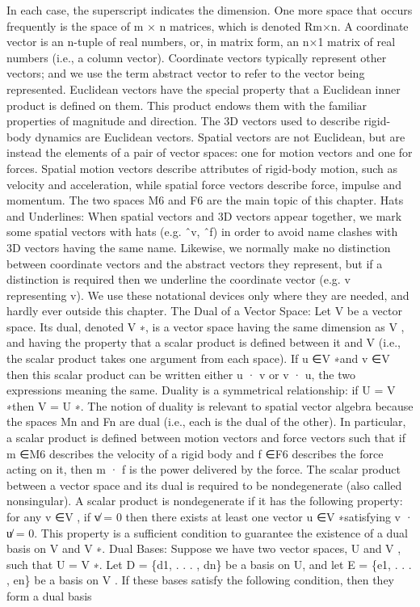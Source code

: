 In each case, the superscript indicates the dimension. One more space that occurs frequently is the space of m × n matrices, which is denoted Rm×n. A coordinate vector is an n-tuple of real numbers, or, in matrix form, an n×1 matrix of real numbers (i.e., a column vector). Coordinate vectors typically represent other vectors; and we use the term abstract vector to refer to the vector being represented. Euclidean vectors have the special property that a Euclidean inner product is defined on them. This product endows them with the familiar properties of magnitude and direction. The 3D vectors used to describe rigid-body dynamics are Euclidean vectors. Spatial vectors are not Euclidean, but are instead the elements of a pair of vector spaces: one for motion vectors and one for forces. Spatial motion vectors describe attributes of rigid-body motion, such as velocity and acceleration, while spatial force vectors describe force, impulse and momentum. The two spaces M6 and F6 are the main topic of this chapter. Hats and Underlines: When spatial vectors and 3D vectors appear together, we mark some spatial vectors with hats (e.g. ˆv, ˆf) in order to avoid name clashes with 3D vectors having the same name. Likewise, we normally make no distinction between coordinate vectors and the abstract vectors they represent, but if a distinction is required then we underline the coordinate vector (e.g. v representing v). We use these notational devices only where they are needed, and hardly ever outside this chapter. The Dual of a Vector Space: Let V be a vector space. Its dual, denoted V ∗, is a vector space having the same dimension as V , and having the property that a scalar product is defined between it and V (i.e., the scalar product takes one argument from each space). If u ∈V ∗and v ∈V then this scalar product can be written either u · v or v · u, the two expressions meaning the same. Duality is a symmetrical relationship: if U = V ∗then V = U ∗. The notion of duality is relevant to spatial vector algebra because the spaces Mn and Fn are dual (i.e., each is the dual of the other). In particular, a scalar product is defined between motion vectors and force vectors such that if m ∈M6 describes the velocity of a rigid body and f ∈F6 describes the force acting on it, then m · f is the power delivered by the force. The scalar product between a vector space and its dual is required to be nondegenerate (also called nonsingular). A scalar product is nondegenerate if it has the following property: for any v ∈V , if v̸ = 0 then there exists at least one vector u ∈V ∗satisfying v · u̸ = 0. This property is a sufficient condition to guarantee the existence of a dual basis on V and V ∗. Dual Bases: Suppose we have two vector spaces, U and V , such that U = V ∗. Let D = \{d1, . . . , dn\} be a basis on U, and let E = \{e1, . . . , en\} be a basis on V . If these bases satisfy the following condition, then they form a dual basis

